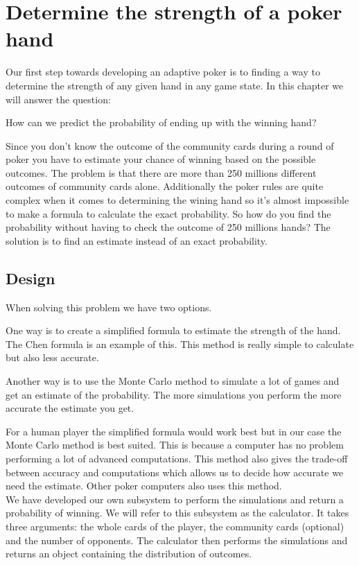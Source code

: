 \section{Determine the strength of a poker hand} \label{sec:monte}
Our first step towards developing an adaptive poker is to finding a way to determine the strength of any given hand in any game state. In this chapter we will answer the question: 

\begin{center}
How can we predict the probability of ending up with the winning hand?
\end{center}

Since you don't know the outcome of the community cards during a round of poker you have to estimate your chance of winning based on the possible outcomes. The problem is that there are more than 250 millions different outcomes of community cards alone. Additionally the poker rules are quite complex when it comes to determining the wining hand so it's almost impossible to make a formula to calculate the exact probability. So how do you find the probability without having to check the outcome of 250 millions hands? 
The solution is to find an estimate instead of an exact probability.

\subsection{Design}
When solving this problem we have two options.

One way is to create a simplified formula to estimate the strength of the hand. The Chen formula is an example of this. This method is really simple to calculate but also less accurate.

Another way is to use the Monte Carlo method to simulate a lot of games and get an estimate of the probability. The more simulations you perform the more accurate the estimate you get.

For a human player the simplified formula would work best but in our case the Monte Carlo method is best suited. This is because a computer has no problem performing a lot of advanced computations. This method also gives the trade-off between accuracy and computations which allows us to decide how accurate we need the estimate. Other poker computers also uses this method.\\

We have developed our own subsystem to perform the simulations and return a probability of winning. We will refer to this subsystem as the calculator. It takes three arguments: the whole cards of the player, the community cards (optional) and the number of opponents. The calculator then performs the simulations and returns an object containing the distribution of outcomes.

